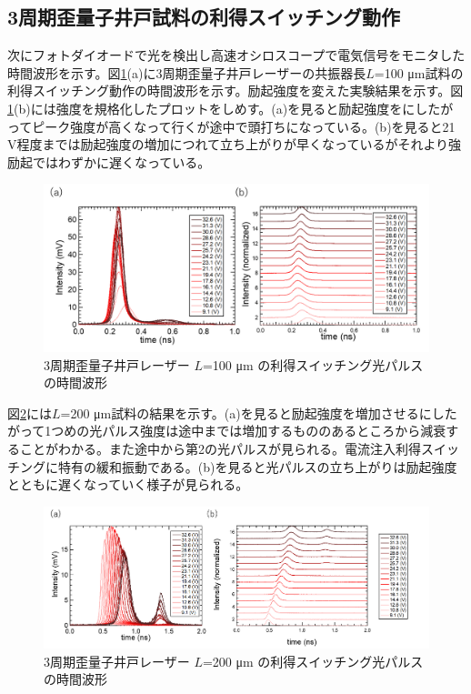 {\subsection{3周期歪量子井戸試料の利得スイッチング動作}%
次にフォトダイオードで光を検出し高速オシロスコープで電気信号をモニタした時間波形を示す。図\ref{fig:fig_3_2_3QW_ridge_L100_GS}(a)に3周期歪量子井戸レーザーの共振器長$L$=100 \si{\micro\metre}試料の利得スイッチング動作の時間波形を示す。励起強度を変えた実験結果を示す。図\ref{fig:fig_3_2_3QW_ridge_L100_GS}(b)には強度を規格化したプロットをしめす。(a)を見ると励起強度をにしたがってピーク強度が高くなって行くが途中で頭打ちになっている。(b)を見ると21 V程度までは励起強度の増加につれて立ち上がりが早くなっているがそれより強励起ではわずかに遅くなっている。
\begin{figure}[h]
	\centering
	\includegraphics[width=15cm]{figure/fig_3_2_3QW_ridge_L100_GS.png}
		\caption{3周期歪量子井戸レーザー $L$=100 \si{\micro\metre} の利得スイッチング光パルスの時間波形}
		\label{fig:fig_3_2_3QW_ridge_L100_GS}
\end{figure}


図\ref{fig:fig_3_2_3QW_ridge_L200_GS}には$L$=200 \si{\micro\metre}試料の結果を示す。(a)を見ると励起強度を増加させるにしたがって1つめの光パルス強度は途中までは増加するもののあるところから減衰することがわかる。また途中から第2の光パルスが見られる。電流注入利得スイッチングに特有の緩和振動である。(b)を見ると光パルスの立ち上がりは励起強度とともに遅くなっていく様子が見られる。


\begin{figure}[h]
	\centering
	\includegraphics[width=15cm]{figure/fig_3_2_3QW_ridge_L200_GS.png}
		\caption{3周期歪量子井戸レーザー $L$=200 \si{\micro\metre} の利得スイッチング光パルスの時間波形}
		\label{fig:fig_3_2_3QW_ridge_L200_GS}
\end{figure}



}
